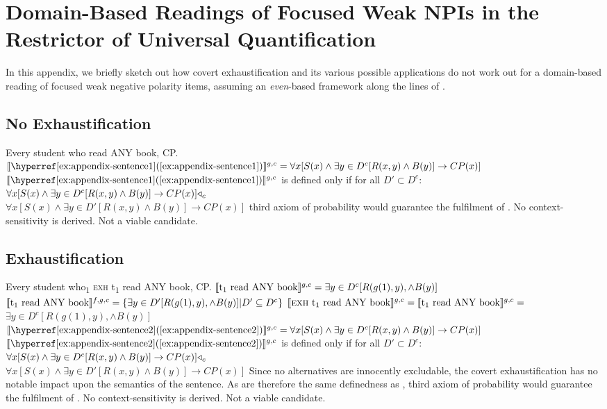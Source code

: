 \chapter{Domain-Based Readings of Focused Weak NPIs in the Restrictor of Universal Quantification}
In this appendix, we briefly sketch out how covert exhaustification and its various possible applications do not work out for a domain-based reading of focused weak negative polarity items, assuming an \textit{even}-based framework along the lines of \citet{Crnic2011,Crnic2014-dogma,Crnic2014-nm}.
\section{No Exhaustification}
\pex
\a Every student who read \MakeUppercase{any} book, CP.
\a $\intension[g,c]{\refex{appendix-sentence1}}=\forall{x}[S(x)\land\exists{y\in D^c}[R(x,y)\land B(y)]\rightarrow CP(x)]$
\a $\intension[g,c]{\refex{appendix-sentence1}}$ is defined only if for all $D'\subset D^c$:\\$\forall{x}[S(x)\land\exists{y\in D^c}[R(x,y)\land B(y)]\rightarrow CP(x)]\lprob_c$\\\emptyfill$\forall{x}[S(x)\land\exists{y\in D'}[R(x,y)\land B(y)]\rightarrow CP(x)]$
\xe
{} third axiom of probability would guarantee the fulfilment of . No context-sensitivity is derived. Not a viable candidate.\pagebreak
\section{Exhaustification}
\pex
\a Every student who\textsubscript{1} {\scshape exh} t\textsubscript{1} read \MakeUppercase{any} book, CP.
\a $\intension[g,c]{t\textsubscript{1} read ANY book}=\exists{y\in D^c}[R(g(1),y),\land B(y)]$
\a $\intension[f,g,c]{t\textsubscript{1} read ANY book}=\{\exists{y\in D'}[R(g(1),y),\land B(y)]|D'\subseteq D^c\}$
\a $\intension[g,c]{{\scshape exh} t\textsubscript{1} read ANY book}=\intension[g,c]{t\textsubscript{1} read ANY book}=$\\\emptyfill$\exists{y\in D^c}[R(g(1),y),\land B(y)]$
\a $\intension[g,c]{\refex{appendix-sentence2}}=\forall{x}[S(x)\land\exists{y\in D^c}[R(x,y)\land B(y)]\rightarrow CP(x)]$
\a $\intension[g,c]{\refex{appendix-sentence2}}$ is defined only if for all $D'\subset D^c$:\\$\forall{x}[S(x)\land\exists{y\in D^c}[R(x,y)\land B(y)]\rightarrow CP(x)]\lprob_c$\\\emptyfill$\forall{x}[S(x)\land\exists{y\in D'}[R(x,y)\land B(y)]\rightarrow CP(x)]$
\xe
Since no alternatives are innocently excludable, the covert exhaustification has no notable impact upon the semantics of the sentence. As  are therefore the same definedness as ,  third axiom of probability would guarantee the fulfilment of . No context-sensitivity is derived. Not a viable candidate.
